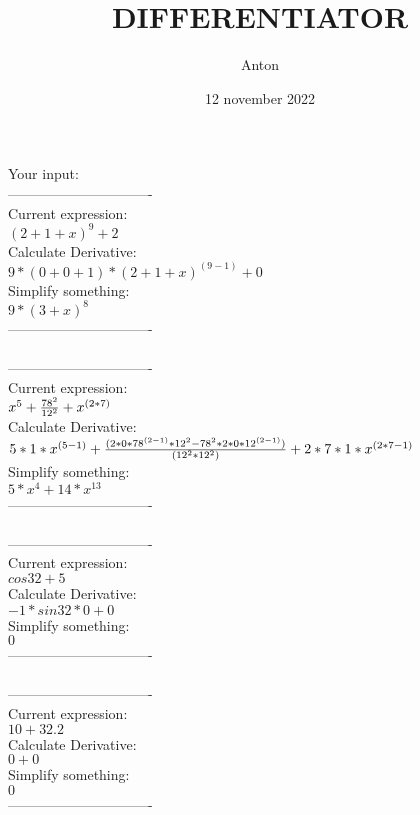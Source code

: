 \documentclass[12pt]{article}
\title{DIFFERENTIATOR}
\author{Anton}
\date{12 november 2022}
\begin{document}
    \maketitle
    Your input: \\
    
-------------------------------\\
Current expression:\\
\( {{(2+1+x)}^{9}}+2\) \\
Calculate Derivative:\\
\( 9*(0+0+1)*{{(2+1+x)}^{(9-1)}}+0\) \\
Simplify something:\\
\( 9*{{(3+x)}^{8}}\) \\
-------------------------------\\
\\
-------------------------------\\
Current expression:\\
\( {{x}^{5}}+{{{{78}^{2}}}\over{{{12}^{2}}}}+{{x}^{(2*7)}}\) \\
Calculate Derivative:\\
\( 5*1*{{x}^{(5-1)}}+{{(2*0*{{78}^{(2-1)}}*{{12}^{2}}-{{78}^{2}}*2*0*{{12}^{(2-1)}})}\over{({{12}^{2}}*{{12}^{2}})}}+2*7*1*{{x}^{(2*7-1)}}\) \\
Simplify something:\\
\( 5*{{x}^{4}}+14*{{x}^{13}}\) \\
-------------------------------\\
\\
-------------------------------\\
Current expression:\\
\( cos32+5\) \\
Calculate Derivative:\\
\( -1*sin32*0+0\) \\
Simplify something:\\
\( 0\) \\
-------------------------------\\
\\
-------------------------------\\
Current expression:\\
\( 10+32.2\) \\
Calculate Derivative:\\
\( 0+0\) \\
Simplify something:\\
\( 0\) \\
-------------------------------\\
\end{document}
